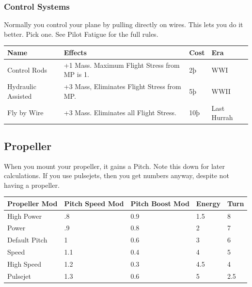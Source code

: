 \documentclass{article}
\begin{document}
\subsubsection{Control Systems}
\label{_Control_Systems}

Normally you control your plane by pulling directly on wires. This lets
you do it better. Pick one. See Pilot Fatigue for the full rules.

\begin{tabular}{|l|l|l|l|}
    \hline
    Name               & Effects                                      & Cost & Era  \\\hline
    Control Rods       & +1 Mass. Maximum Flight Stress from MP is 1. & 2þ   &
    WWI                                                                             \\\hline
    Hydraulic Assisted & +3 Mass, Eliminates Flight Stress from MP.   & 5þ   &
    WWII                                                                            \\\hline
    Fly by Wire        & +3 Mass. Eliminates all Flight Stress.       & 10þ  & Last
    Hurrah                                                                          \\\hline
\end{tabular}

\subsection{Propeller}
\label{_Propeller}

When you mount your propeller, it gains a Pitch. Note this down for
later calculations.  If you use pulsejets, then you get numbers anyway,
despite not having a propeller.

\begin{tabular}{|l|l|l|l|l|}
    \hline
    Propeller Mod & Pitch Speed Mod & Pitch Boost Mod & Energy & Turn \\\hline
    High Power    & .8              & 0.9             & 1.5    & 8    \\\hline
    Power         & .9              & 0.8             & 2      & 7    \\\hline
    Default Pitch & 1               & 0.6             & 3      & 6    \\\hline
    Speed         & 1.1             & 0.4             & 4      & 5    \\\hline
    High Speed    & 1.2             & 0.3             & 4.5    & 4    \\\hline
    Pulsejet      & 1.3             & 0.6             & 5      & 2.5  \\\hline
\end{tabular}
\end{document}

